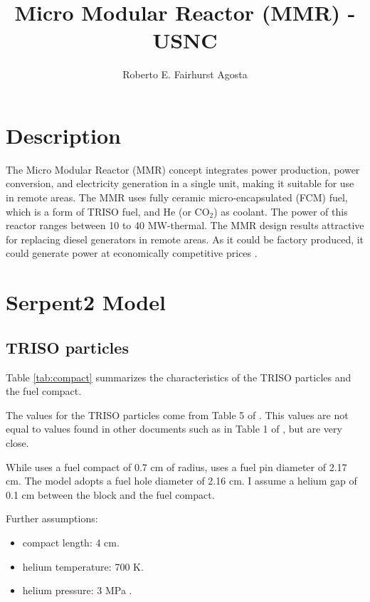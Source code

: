 \documentclass[11pt,letterpaper]{article}
\title{Micro Modular Reactor (MMR) - USNC}
\author{Roberto E. Fairhurst Agosta}
\begin{document}

\section{Description}

The Micro Modular Reactor (MMR) concept integrates power production, power conversion, and electricity generation in a single unit, making it suitable for use in remote areas. 
The MMR uses fully ceramic micro-encapsulated (FCM) fuel, which is a form of TRISO fuel, and He (or CO$_2$) as coolant.
The power of this reactor ranges between 10 to 40 MW-thermal.
The MMR design results attractive for replacing diesel generators in remote areas.
As it could be factory produced, it could generate power at economically competitive prices \cite{hawari_development_2018}.

\section{Serpent2 Model}

\subsection{TRISO particles}

Table \ref{tab:compact} summarizes the characteristics of the TRISO particles and the fuel compact.

The values for the TRISO particles come from Table 5 of \cite{hawari_development_2018}.
This values are not equal to values found in other documents such as in Table 1 of \cite{venneri_neutronic_2015}, but are very close.

While \cite{venneri_neutronic_2015} uses a fuel compact of 0.7 cm of radius, \cite{hawari_development_2018} uses a fuel pin diameter of 2.17 cm.
The model adopts a fuel hole diameter of 2.16 cm.
I assume a helium gap of 0.1 cm between the block and the fuel compact.

Further assumptions:
\begin{itemize}
	\item compact length: 4 cm.
	\item helium temperature: 700 K.
	\item helium pressure: 3 MPa \cite{hawari_development_2018}.
\end{itemize}
\end{document}
